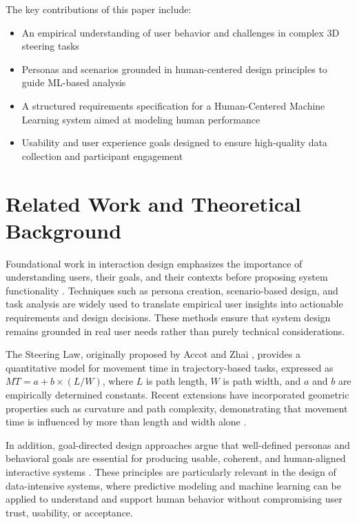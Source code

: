 \documentclass[sigconf]{acmart}
\begin{document}
The key contributions of this paper include:
\begin{itemize}
  \item An empirical understanding of user behavior and challenges in complex 3D steering tasks
  \item Personas and scenarios grounded in human-centered design principles to guide ML-based analysis
  \item A structured requirements specification for a Human-Centered Machine Learning system aimed at modeling human performance
  \item Usability and user experience goals designed to ensure high-quality data collection and participant engagement
\end{itemize}







\section{Related Work and Theoretical Background}

Foundational work in interaction design emphasizes the importance of understanding users, their goals, and their contexts before proposing system functionality \cite{sharp2019interaction, preece2015interaction}. Techniques such as persona creation, scenario-based design, and task analysis are widely used to translate empirical user insights into actionable requirements and design decisions. These methods ensure that system design remains grounded in real user needs rather than purely technical considerations.

The Steering Law, originally proposed by Accot and Zhai \cite{accot1997beyond}, provides a quantitative model for movement time in trajectory-based tasks, expressed as $MT = a + b \times (L/W)$, where $L$ is path length, $W$ is path width, and $a$ and $b$ are empirically determined constants. Recent extensions have incorporated geometric properties such as curvature and path complexity, demonstrating that movement time is influenced by more than length and width alone \cite{chen2025curves, liu2011revisiting}.

In addition, goal-directed design approaches argue that well-defined personas and behavioral goals are essential for producing usable, coherent, and human-aligned interactive systems \cite{cooper2014aboutface}. These principles are particularly relevant in the design of data-intensive systems, where predictive modeling and machine learning can be applied to understand and support human behavior without compromising user trust, usability, or acceptance.
\end{document}
